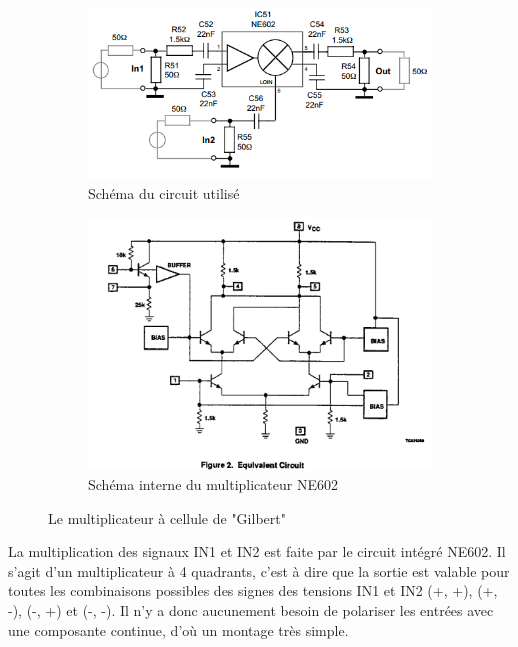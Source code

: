 \documentclass{article}
\begin{document}
\begin{figure}[h]
	\centering
	\begin{subfigure}[b]{0.6\textwidth}
		\centering
		\includegraphics[width=\textwidth]{shema_melangeur_gilbert}
		\caption{Schéma du circuit utilisé}
		\label{fig:schema_melangeur_gilbert}
	\end{subfigure}
	\hfill
	\begin{subfigure}[b]{0.35\textwidth}
		\centering
		\includegraphics[width=\textwidth]{shema_interne_ne602}
		\caption{Schéma interne du multiplicateur NE602}
		\label{fig:schema_melangeur_gilbert_interne}
	\end{subfigure}
	\caption{Le multiplicateur à cellule de "Gilbert"}
\end{figure}

La multiplication des signaux IN1 et IN2 est faite par le circuit intégré NE602.
Il s'agit d'un multiplicateur à 4 quadrants, c'est à dire que la sortie est valable pour toutes les combinaisons possibles des signes des tensions IN1 et IN2 (+, +), (+, -), (-, +) et (-, -).
Il n'y a donc aucunement besoin de polariser les entrées avec une composante continue, d'où un montage très simple.
\end{document}
